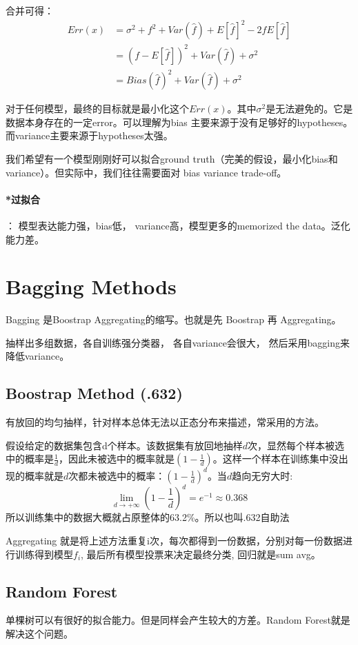 \documentclass[12pt,a4paper,oneside]{article}
\begin{document}
\begin{CJK*}{UTF8}{gbsn}
合并可得：
\begin{align*}
Err(x) &= \sigma^{2} +f^{2} + Var\left( \hat{f}\right) + E\left[\hat{f} \right]^{2} -2 fE\left[ \hat{f} \right] \\
&= \left(f-E\left[\hat{f}\right] \right)^{2}+Var(\hat{f})+\sigma^{2} \\
&= Bias(\hat{f})^{2} +Var(\hat{f}) + \sigma^{2}
\end{align*}

对于任何模型，最终的目标就是最小化这个$Err(x)$。其中$\sigma^{2}$是无法避免的。它是数据本身存在的一定error。可以理解为bias 主要来源于没有足够好的hypotheses。 而variance主要来源于hypotheses太强。

我们希望有一个模型刚刚好可以拟合ground truth（完美的假设，最小化bias和variance）。但实际中，我们往往需要面对 bias variance trade-off。

\paragraph{*过拟合}： 模型表达能力强，bias低， variance高，模型更多的memorized the data。泛化能力差。

\section{Bagging Methods}
Bagging 是Boostrap Aggregating的缩写。也就是先 Boostrap 再 Aggregating。

抽样出多组数据，各自训练强分类器， 各自variance会很大， 然后采用bagging来降低variance。

\subsection{Boostrap Method (.632)}

有放回的均匀抽样，针对样本总体无法以正态分布来描述，常采用的方法。

假设给定的数据集包含d个样本。该数据集有放回地抽样$d$次，显然每个样本被选中的概率是$\frac{1}{d}$，因此未被选中的概率就是$\left( 1-\frac{1}{d}\right)$。这样一个样本在训练集中没出现的概率就是$d$次都未被选中的概率：$(1-\frac{1}{d})^{d}$。当$d$趋向无穷大时:
$$\mathop{lim} \limits_{d\to +\infty} (1-\frac{1}{d})^{d} = e^{-1} \approx 0.368$$
所以训练集中的数据大概就占原整体的63.2\%。所以也叫.632自助法

Aggregating 就是将上述方法重复i次，每次都得到一份数据，分别对每一份数据进行训练得到模型$f_{i}$, 最后所有模型投票来决定最终分类, 回归就是sum avg。

\subsection{Random Forest}
单棵树可以有很好的拟合能力。但是同样会产生较大的方差。Random Forest就是解决这个问题。


\end{CJK*}
\end{document}
